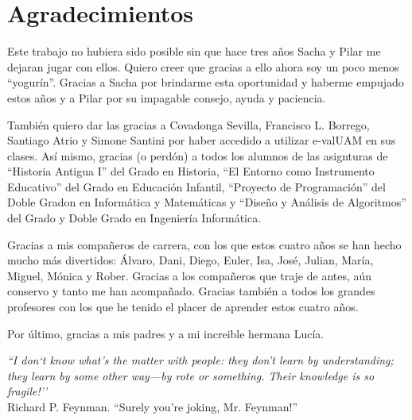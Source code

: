 \chapter*{Agradecimientos}

Este trabajo no hubiera sido posible sin que hace tres años Sacha y Pilar me dejaran jugar con ellos. Quiero creer que gracias a ello ahora soy un poco menos ``yogurín''. Gracias a Sacha por brindarme esta oportunidad y haberme empujado estos años y a Pilar por su impagable consejo, ayuda y paciencia.

También quiero dar las gracias a Covadonga Sevilla, Francisco L. Borrego, Santiago Atrio y Simone Santini por haber accedido a utilizar e-valUAM en sus clases. Así mismo, gracias (o perdón) a todos los alumnos de las asignturas de ``Historia Antigua I'' del Grado en Historia, ``El Entorno como Instrumento Educativo'' del Grado en Educación Infantil, ``Proyecto de Programación'' del Doble Gradon en Informática y Matemáticas y ``Diseño y Análisis de Algoritmos'' del Grado y Doble Grado en Ingeniería Informática.

Gracias a mis compañeros de carrera, con los que estos cuatro años se han hecho mucho más divertidos: Álvaro, Dani, Diego, Euler, Isa, José, Julian, María, Miguel, Mónica y Rober. Gracias a los compañeros que traje de antes, aún conservo y tanto me han acompañado. Gracias también a todos los grandes profesores con los que he tenido el placer de aprender estos cuatro años.

Por último, gracias a mis padres y a mi increible hermana Lucía.



\begin{flushright}
\textit{%
``I don`t know what's the matter with people: they don't learn by understanding; they learn by some other way---by rote or something. Their knowledge is so fragile!''\\}
Richard P. Feynman. ``Surely you're joking, Mr. Feynman!''
\end{flushright}

